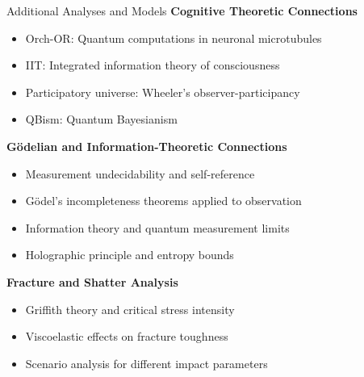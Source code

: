 \documentclass{beamer}
\begin{document}
\begin{frame}{Additional Analyses and Models}
\textbf{Cognitive Theoretic Connections}
\begin{itemize}
\item Orch-OR: Quantum computations in neuronal microtubules
\item IIT: Integrated information theory of consciousness
\item Participatory universe: Wheeler's observer-participancy
\item QBism: Quantum Bayesianism
\end{itemize}

\vspace{0.2cm}
\textbf{G\"odelian and Information-Theoretic Connections}
\begin{itemize}
\item Measurement undecidability and self-reference
\item G\"odel's incompleteness theorems applied to observation
\item Information theory and quantum measurement limits
\item Holographic principle and entropy bounds
\end{itemize}

\vspace{0.2cm}
\textbf{Fracture and Shatter Analysis}
\begin{itemize}
\item Griffith theory and critical stress intensity
\item Viscoelastic effects on fracture toughness
\item Scenario analysis for different impact parameters
\end{itemize}
\end{frame}
\end{document}
